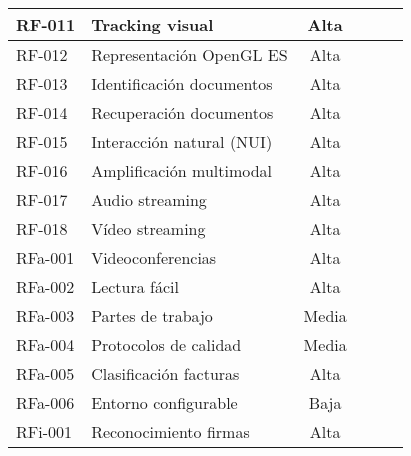 \begin{center}
\begin{tabular}{|l|l|c|l|l|l|}
  RF-011              & Tracking visual            & Alta               &                     &                        &                                \\ \hline
  RF-012              & Representación OpenGL ES   & Alta               &                     &                        &                                \\ \hline
  RF-013              & Identificación documentos  & Alta               &                     &                        &                                \\ \hline
  RF-014              & Recuperación documentos    & Alta               &                     &                        &                                \\ \hline
  RF-015              & Interacción natural (NUI)  & Alta               &                     &                        &                                \\ \hline
  RF-016              & Amplificación multimodal   & Alta               &                     &                        &                                \\ \hline
  RF-017              & Audio streaming            & Alta               &                     &                        &                                \\ \hline
  RF-018              & Vídeo streaming            & Alta               &                     &                        &                                \\ \hline
  RFa-001             & Videoconferencias          & Alta               &                     &                        &                                \\ \hline
  RFa-002             & Lectura fácil              & Alta               &                     &                        &                                \\ \hline
  RFa-003             & Partes de trabajo          & Media              &                     &                        &                                \\ \hline
  RFa-004             & Protocolos de calidad      & Media              &                     &                        &                                \\ \hline
  RFa-005             & Clasificación facturas     & Alta               &                     &                        &                                \\ \hline
  RFa-006             & Entorno configurable       & Baja               &                     &                        &                                \\ \hline
  RFi-001             & Reconocimiento firmas      & Alta               &                     &                        &                                \\ \hline
\end{tabular}
\end{center}